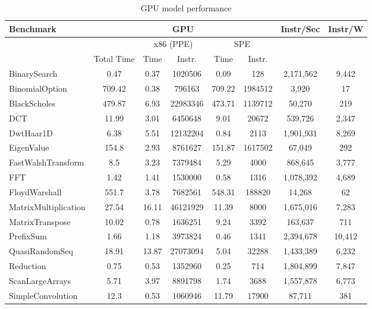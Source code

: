 \documentclass{sig-alternate-05-2015}
\begin{document}
\begin{table}
\centering
\begin{tabular}{| l | c | c | c | c | c | c | c |} \hline
Benchmark & \multicolumn{5}{|c|}{GPU}   &   Instr/Sec & Instr/W \\ \hline
 & & \multicolumn{2}{|c|}{x86 (PPE)} & \multicolumn{2}{|c|}{SPE} \\ \hline
 & Total Time & Time & Instr. & Time & Instr. & & \\ \hline    
BinarySearch & 0.47 & 0.37 & 1020506 & 0.09 & 128 & 2,171,562 & 9,442 \\ \hline
BinomialOption & 709.42 & 0.38 & 796163 & 709.22 & 1984512 & 3,920 & 17 \\ \hline
BlackScholes & 479.87 & 6.93 & 22983346 & 473.71 & 1139712 & 50,270 & 219 \\ \hline
DCT & 11.99 & 3.01 & 6450648 & 9.01 & 20672 & 539,726 & 2,347 \\ \hline
DwtHaar1D & 6.38 & 5.51 & 12132204 & 0.84 & 2113 & 1,901,931 & 8,269 \\ \hline
EigenValue & 154.8 & 2.93 & 8761627 & 151.87 & 1617502 & 67,049 & 292 \\ \hline
FastWalshTransform & 8.5 & 3.23 & 7379484 & 5.29 & 4000 & 868,645 & 3,777 \\ \hline
FFT & 1.42 & 1.41 & 1530000 & 0.58 & 1316 & 1,078,392 & 4,689 \\ \hline
FloydWarshall & 551.7 & 3.78 & 7682561 & 548.31 & 188820 & 14,268 & 62 \\ \hline
MatrixMultiplication & 27.54 & 16.11 & 46121929 & 11.39 & 8000 & 1,675,016 & 7,283 \\ \hline
MatrixTranspose & 10.02 & 0.78 & 1636251 & 9.24 & 3392 & 163,637 & 711 \\ \hline
PrefixSum & 1.66 & 1.18 & 3973824 & 0.46 & 1341 & 2,394,678 & 10,412 \\ \hline
QuasiRandomSeq & 18.91 & 13.87 & 27073094 & 5.04 & 32288 & 1,433,389 & 6,232 \\ \hline
Reduction & 0.75 & 0.53 & 1352960 & 0.25 & 714 & 1,804,899 & 7,847 \\ \hline
ScanLargeArrays & 5.71 & 3.97 & 8891798 & 1.74 & 3688 & 1,557,878 & 6,773 \\ \hline
SimpleConvolution & 12.3 & 0.53 & 1060946 & 11.79 & 17900 & 87,711 & 381 \\ \hline
\end{tabular}
\label{table:gpu_performance}
\caption{GPU model performance}
\end{table}
\end{document}
